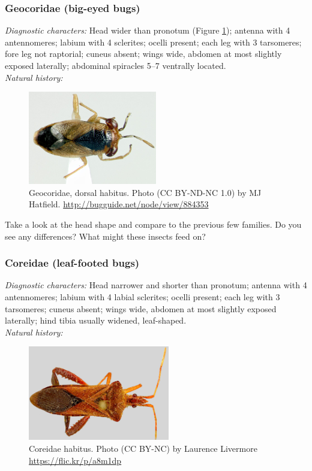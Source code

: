\documentclass[letterpaper, 11pt]{article}
\begin{document}
\subsubsection{Geocoridae (big-eyed bugs)}
\noindent{}\textit{Diagnostic characters:} Head wider than pronotum (Figure \ref{fig:geocorid1}); antenna with 4 antennomeres; labium with 4 sclerites; ocelli present; each leg with 3 tarsomeres; fore leg not raptorial; cuneus absent; wings wide, abdomen at most slightly exposed laterally; abdominal spiracles 5--7 ventrally located.\\

\noindent{}\textit{Natural history:} \\

\begin{figure}[ht!]
 \centering
 \includegraphics[width=0.5\textwidth]{GeocoridHabitus}
 \caption{Geocoridae, dorsal habitus. Photo (CC BY-ND-NC 1.0) by MJ Hatfield. \url{http://bugguide.net/node/view/884353}}
 \label{fig:geocorid1}
\end{figure}

\noindent{}Take a look at the head shape and compare to the previous few families. Do you see any differences? What might these insects feed on?\vspace{3cm}

\subsubsection{Coreidae (leaf-footed bugs)}
\noindent{}\textit{Diagnostic characters:} Head narrower and shorter than pronotum; antenna with 4 antennomeres; labium with 4 labial sclerites; ocelli present; each leg with 3 tarsomeres; cuneus absent; wings wide, abdomen at most slightly exposed laterally; hind tibia usually widened, leaf-shaped.\\

\noindent{}\textit{Natural history:} \\

\begin{figure}[ht!]
 \centering
 \includegraphics[width=0.55\textwidth]{CoreidHabitus}
 \caption{Coreidae habitus. Photo (CC BY-NC) by Laurence Livermore \url{https://flic.kr/p/a8m1dp}}
 \label{fig:coreid1}
\end{figure}
\end{document}

